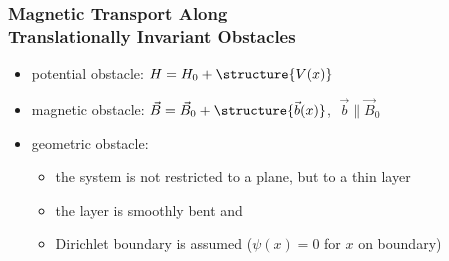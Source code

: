 \documentclass{beamer}
\begin{document}
\begin{frame}
    \frametitle{{\color{gray}Magnetic Transport Along} \\ Translationally Invariant Obstacles}
    \begin{itemize}
        \item potential obstacle: $H = H_0 + \structure{V(x)}$
        \item magnetic obstacle: $\vec B = \vec B_0 + \structure{\vec b(x)}$, $\; \vec b \parallel \vec B_0$
        \item geometric obstacle:
        \begin{itemize}
            \item the system is not restricted to a plane, but to a thin layer
            \item the layer is smoothly bent and 
            \item Dirichlet boundary is assumed ($\psi(x) = 0$ for $x$ on boundary)
        \end{itemize}
    \end{itemize}
\end{frame}
\end{document}
